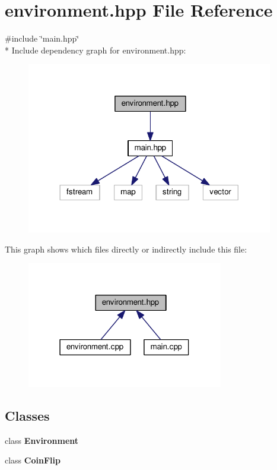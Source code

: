\section{environment.\+hpp File Reference}
\label{environment_8hpp}
{\ttfamily \#include \char`\"{}main.\+hpp\char`\"{}}\\*
Include dependency graph for environment.\+hpp\+:
\nopagebreak
\begin{figure}[H]
\begin{center}
\leavevmode
\includegraphics[width=305pt]{environment_8hpp__incl}
\end{center}
\end{figure}
This graph shows which files directly or indirectly include this file\+:
\nopagebreak
\begin{figure}[H]
\begin{center}
\leavevmode
\includegraphics[width=243pt]{environment_8hpp__dep__incl}
\end{center}
\end{figure}
\subsection*{Classes}
\begin{DoxyCompactItemize}
\item 
class {\bf Environment}
\item 
class {\bf Coin\+Flip}
\end{DoxyCompactItemize}
